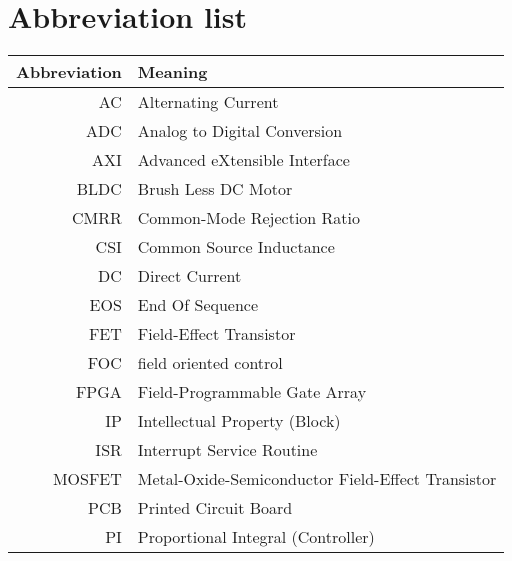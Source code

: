 \section{Abbreviation list}
\label{sec:abbreviation_list}

\begin{table}[H]
\centering
\begin{tabular}{|r|l|}
\hline
\textbf{Abbreviation} & \textbf{Meaning}                                        \\ \hline
AC           & Alternating Current                                              \\ \hline
ADC          & Analog to Digital Conversion                                     \\ \hline
AXI          & Advanced eXtensible Interface                                    \\ \hline
BLDC         & Brush Less DC Motor                                              \\ \hline
CMRR         & Common-Mode Rejection Ratio                                      \\ \hline
CSI          & Common Source Inductance                                         \\ \hline
DC           & Direct Current                                                   \\ \hline
EOS          & End Of Sequence                                                  \\ \hline
FET          & Field-Effect Transistor                                          \\ \hline
FOC          & field oriented control                                           \\ \hline
FPGA         & Field-Programmable Gate Array                                    \\ \hline
IP           & Intellectual Property (Block)                                    \\ \hline
ISR          & Interrupt Service Routine                                        \\ \hline
MOSFET       & Metal-Oxide-Semiconductor Field-Effect Transistor                \\ \hline
PCB          & Printed Circuit Board                                            \\ \hline
PI           & Proportional Integral (Controller)                               \\ \hline

\end{tabular}
\end{table}
